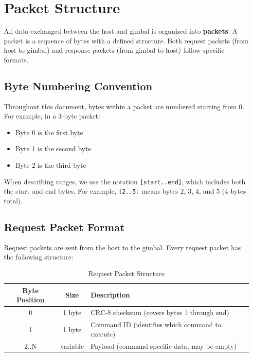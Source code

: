 \documentclass[12pt, titlepage]{article}
\begin{document}
\section{Packet Structure}

All data exchanged between the host and gimbal is organized into
\textbf{packets}. A packet is a sequence of bytes with a defined structure.
Both request packets (from host to gimbal) and response packets (from gimbal to
host) follow specific formats.

\subsection{Byte Numbering Convention}

Throughout this document, bytes within a packet are numbered starting from 0.
For example, in a 3-byte packet:
\begin{itemize}
  \item Byte 0 is the first byte
  \item Byte 1 is the second byte
  \item Byte 2 is the third byte
\end{itemize}

When describing ranges, we use the notation \texttt{[start..end]}, which
includes both the start and end bytes. For example, \texttt{[2..5]} means bytes
2, 3, 4, and 5 (4 bytes total).

\subsection{Request Packet Format}

Request packets are sent from the host to the gimbal. Every request packet has
the following structure:

\begin{table}[H]
  \centering
  \begin{tabular}{ccl}
    \toprule
    \textbf{Byte Position} & \textbf{Size} & \textbf{Description}                             \\
    \midrule
    0                      & 1 byte        & CRC-8 checksum (covers bytes 1 through end)      \\
    1                      & 1 byte        & Command ID (identifies which command to execute) \\
    2..N                   & variable      & Payload (command-specific data, may be empty)    \\
    \bottomrule
  \end{tabular}
  \caption{Request Packet Structure}
\end{table}
\end{document}
